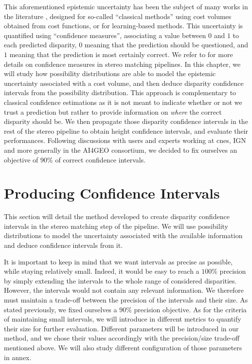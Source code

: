 This aforementioned epistemic uncertainty has been the subject of many works in the literature \cite{hu_quantitative_2012,  poggi_confidence_2021,wang_uncertainty_2022}, designed for so-called ``classical methods'' using cost volumes obtained from cost functions, or for learning-based methods. This uncertainty is quantified using ``confidence measures'', associating a value between $0$ and $1$ to each predicted disparity, $0$ meaning that the prediction should be questioned,  and $1$ meaning that the prediction is most certainly correct. We refer to  for more details on confidence measures in stereo matching pipelines. In this chapter, we will study how possibility distributions are able to model the epistemic uncertainty associated with a cost volume, and then deduce disparity confidence intervals from the possibility distribution. This approach is complementary to classical confidence estimations as it is not meant to indicate whether or not we trust a prediction but rather to provide information on \textit{where} the correct disparity should be. We then propagate those disparity confidence intervals in the rest of the stereo pipeline to obtain height confidence intervals, and evaluate their performances. Following discussions with users and experts working at \acrshort{cnes}, IGN and more generally in the AI4GEO consortium, we decided to fix ourselves an objective of $90\%$ of correct confidence intervals.

\section{Producing Confidence Intervals}
This section will detail the method developed to create disparity confidence intervals in the stereo matching step of the pipeline. We will use possibility distributions to model the uncertainty associated with the available information and deduce confidence intervals from it.

It is important to keep in mind that we want intervals as precise as possible, while staying relatively small. Indeed, it would be easy to reach a $100\%$ precision by simply extending the intervals to the whole range of considered disparities. However, the intervals would not contain any relevant information. We therefore must maintain a trade-off between the precision of the intervals and their size. As stated previously, we fixed ourselves a $90\%$ precision objective. As for the criteria of maintaining small intervals, we will introduce in  different metrics to quantify their size for further evaluation. Different parameters will be introduced in our method, and we chose their values accordingly with the precision/size trade-off mentioned above. We will also study different configuration of those parameters in annex. 

